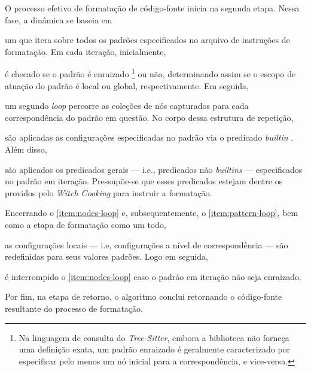 \documentclass
  [11pt,a4paper,english,brazil,openright,sumario=tradicional,twoside]
  {abntex2}
\newcommand{\treesitter}{\textit{Tree-Sitter}\xspace}
\newcommand{\witchcooking}{\textit{Witch Cooking}\xspace}
\begin{document}
{{  O processo efetivo de formatação de código-fonte inicia na segunda etapa.
  Nessa fase, a dinâmica se baseia em
  \begin{inparaenum}
    \item \label{item:pattern-loop} um \textit{} que itera sobre
          todos os padrões especificados no arquivo de instruções de
          formatação. Em cada iteração, inicialmente,
    \item é checado se o padrão é enraizado%
          \footnote
            { Na linguagem de consulta do \treesitter, embora a biblioteca não
              forneça uma definição exata, um padrão enraizado é geralmente
              caracterizado por especificar pelo menos um nó inicial para a
              correspondência, e vice-versa.}
          ou não, determinando assim se o escopo de atuação do padrão é local
          ou global, respectivamente. Em seguida,
    \item \label{item:nodes-loop} um segundo \textit{loop} percorre as coleções
          de nós capturados para cada correspondência do padrão em questão. No
          corpo dessa estrutura de repetição,
    \item são aplicadas as configurações especificadas no padrão via o
          predicado \textit{builtin} . Além disso,
    \item são aplicados os predicados gerais --- i.e., predicados não
          \textit{builtins} --- especificados no padrão em iteração.
          Pressupõe-se que esses predicados estejam dentre os providos pelo
          \witchcooking para instruir a formatação.

          Encerrando o \cref{item:nodes-loop} e, subsequentemente, o
          \cref{item:pattern-loop}, bem como a etapa de formatação como um
          todo,
    \item as configurações locais --- i.e, configurações a nível de
          correspondência --- são redefinidas para seus valores padrões. Logo
          em seguida,
    \item é interrompido o \cref{item:nodes-loop} caso o padrão em iteração não
          seja enraizado.
  \end{inparaenum}
  Por fim, na etapa de retorno, o algoritmo conclui retornando o código-fonte
  resultante do processo de formatação.

}}
\end{document}

